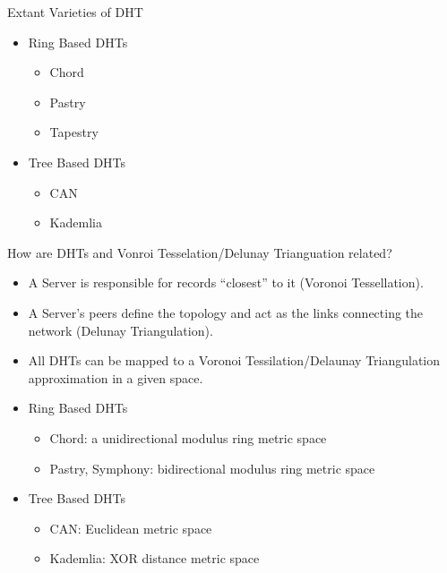 \documentclass[8pt]{beamer}
\begin{document}
\begin{frame}{Extant Varieties of DHT}
	\begin{itemize}
		\item Ring Based DHTs
		\begin{itemize}
			\item Chord
			\item Pastry
			\item Tapestry
		\end{itemize}
		\item Tree Based DHTs
		\begin{itemize}
			\item CAN
			\item Kademlia
		\end{itemize}
	\end{itemize}
\end{frame}

\begin{frame}{How are DHTs and Vonroi Tesselation/Delunay Trianguation related?}
	\begin{itemize}
		\item A Server is responsible for records ``closest'' to it (Voronoi Tessellation).
		\item A Server's peers define the topology and act as the links connecting the network (Delunay Triangulation).
		\item All DHTs can be mapped to a Voronoi Tessilation/Delaunay Triangulation approximation in a given space.
	\end{itemize}
	
	
	
	\begin{itemize}
		\item Ring Based DHTs
		\begin{itemize}
			\item Chord: a unidirectional modulus ring metric space
			\item Pastry, Symphony: bidirectional modulus ring metric space
		\end{itemize}
		\item Tree Based DHTs
		\begin{itemize}
			\item CAN: Euclidean metric space
			\item Kademlia: XOR distance metric space 
		\end{itemize}
	\end{itemize}
\end{frame}
\end{document}

